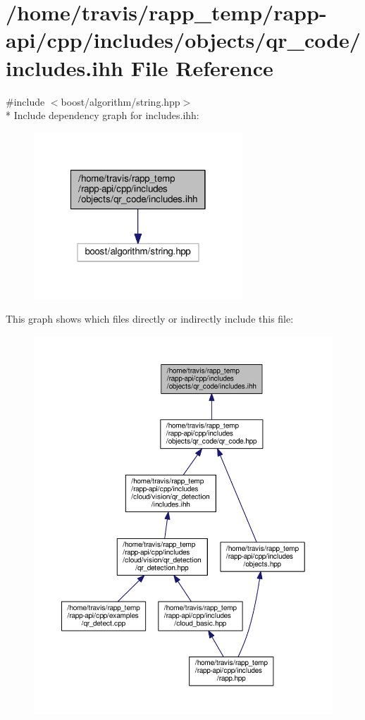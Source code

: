 \hypertarget{objects_2qr__code_2includes_8ihh}{\section{/home/travis/rapp\-\_\-temp/rapp-\/api/cpp/includes/objects/qr\-\_\-code/includes.ihh File Reference}
\label{objects_2qr__code_2includes_8ihh}
}
{\ttfamily \#include $<$boost/algorithm/string.\-hpp$>$}\\*
Include dependency graph for includes.\-ihh\-:
\nopagebreak
\begin{figure}[H]
\begin{center}
\leavevmode
\includegraphics[width=222pt]{objects_2qr__code_2includes_8ihh__incl}
\end{center}
\end{figure}
This graph shows which files directly or indirectly include this file\-:
\nopagebreak
\begin{figure}[H]
\begin{center}
\leavevmode
\includegraphics[width=350pt]{objects_2qr__code_2includes_8ihh__dep__incl}
\end{center}
\end{figure}
